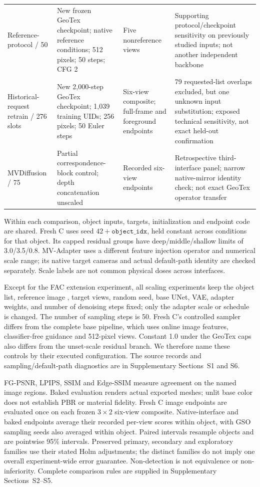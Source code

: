 \documentclass[times,twocolumn,final]{elsarticle}
\providecommand{\DIFadd}[1]{{\protect\color{blue} \sf #1}} %
\providecommand{\DIFdel}[1]{{\protect\color{red} \scriptsize #1}} %
\providecommand{\DIFaddbegin}{} %
\providecommand{\DIFaddend}{} %
\providecommand{\DIFdelbegin}{} %
\providecommand{\DIFdelend}{} %
\begin{document}
\begin{table}[t]
\begin{tabular}{p{}p{}p{}p{}}
Reference-protocol / 50 & New frozen GeoTex checkpoint; native reference conditions; 512 pixels; 50 steps; CFG 2 & Five nonreference views & Supporting protocol/checkpoint sensitivity on previously studied inputs; not another independent backbone \\
Historical-request retrain / 276 slots & New 2,000-step GeoTex checkpoint; 1,039 training UIDs; 256 pixels; 50 Euler steps & Six-view composite; full-frame and foreground endpoints & 79 requested-list overlaps excluded, but one unknown input substitution; exposed technical sensitivity, not exact held-out confirmation \\
MVDiffusion / 75 & Partial correspondence-block control; depth concatenation unscaled & Recorded six-view endpoints & Retrospective third-interface panel; narrow native-mirror identity check; not exact GeoTex operator transfer \\
\bottomrule
\end{tabular}
\end{table}

\DIFadd{Within each comparison, object inputs, targets, initialization and endpoint code are shared. Fresh C uses seed $42+\texttt{object\_idx}$, held constant across conditions for that object. Its capped residual groups have deep/middle/shallow limits of 3.0/3.5/0.8}\DIFaddend . \DIFaddbegin \DIFadd{MV-Adapter uses a different feature injection operator and numerical scale range; its native target cameras and actual default-path identity are checked separately. Scale labels are not common physical doses across interfaces.
}\DIFaddend 

\DIFdelbegin \DIFdel{Except for the FAC extension experiment, all scaling experiments keep the object list, reference image , target views, random seed, base UNet, VAE, adapter weights, and number of denoising steps fixed; only the adapter scale or schedule is changed.
The number of sampling steps is 50. }\DIFdelend \DIFaddbegin \DIFadd{Fresh C's controlled sampler differs from the complete base pipeline, which uses online image features, classifier-free guidance and 512-pixel views. Constant 1.0 under the GeoTex caps also differs from the unset-scale residual branch. We therefore name these controls by their executed configuration. The source records and sampling/default-path diagnostics are in Supplementary Sections~S1 and S6.
}

\DIFadd{FG-PSNR, LPIPS, SSIM and Edge-SSIM measure agreement on the named image regions. Baked evaluation renders actual exported meshes; unlit base color does not establish PBR or material fidelity. Fresh C image endpoints are evaluated once on each frozen $3\times2$ six-view composite. Native-interface and baked endpoints average their recorded per-view scores within object, with GSO sampling seeds also averaged within object. Paired intervals resample objects and are pointwise 95\% intervals. Preserved primary, secondary and exploratory families use their stated Holm adjustments; the distinct families do not imply one overall experiment-wide error guarantee. Non-detection is not equivalence or non-inferiority. Complete comparison rules are supplied in Supplementary Sections~S2--S5.
}
\end{document}
